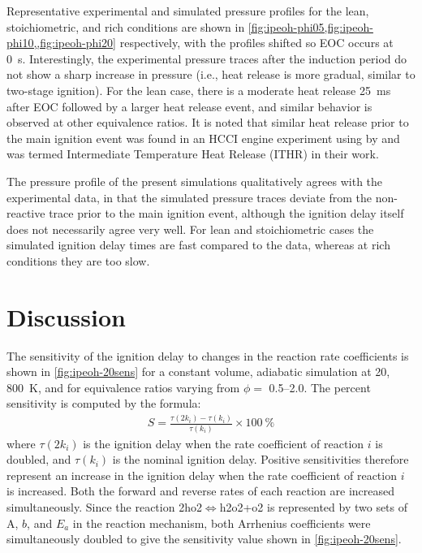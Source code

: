 \documentclass[../main.tex]{subfiles}
\begin{document}
Representative experimental and simulated pressure profiles for the lean,
stoichiometric, and rich conditions are shown in
\cref{fig:ipeoh-phi05,fig:ipeoh-phi10,,fig:ipeoh-phi20} respectively,
with the profiles shifted so EOC occurs at \SI{0}{\second}. Interestingly,
the experimental pressure traces after the induction period do not show
a sharp increase in pressure (i.e., heat release is more gradual,
similar to two-stage ignition). For the lean case, there is a moderate
heat release \SI{25}{\milli\second} after EOC followed by a larger heat
release event, and similar behavior is observed at other equivalence ratios.
It is noted that similar heat release prior to the main ignition event
was found in an HCCI engine experiment using \iPeOH{} by \textcite{Yang2010}
and was termed Intermediate Temperature Heat Release (ITHR) in their
work.

The pressure profile of the present simulations qualitatively
agrees with the experimental data, in that the simulated pressure
traces deviate from the non-reactive trace prior to the main ignition
event, although the ignition delay itself does not necessarily
agree very well. For lean and stoichiometric cases the simulated
ignition delay times are fast compared to the data, whereas at rich
conditions they are too slow.

\section{Discussion}
\label{sec:ipeoh-discussion}

The sensitivity of the ignition delay to changes in the reaction rate
coefficients is shown in \cref{fig:ipeoh-20sens} for a constant volume,
adiabatic simulation at \SI{20}{\atmosphere}, \SI{800}{\kelvin}, and for
equivalence ratios varying from $\phi=$ \numrange{0.5}{2.0}. The percent
sensitivity is computed by the formula:
%
\begin{align}
S = \frac{\tau(2k_i)-\tau(k_i)}{\tau(k_i)} \times \SI{100}{\percent}
\end{align}
%
where $\tau(2k_i)$ is the ignition delay when the rate coefficient of
reaction $i$ is doubled, and $\tau(k_i)$ is the nominal ignition delay.
Positive sensitivities therefore represent an increase in the ignition
delay when the rate coefficient of reaction $i$ is increased. Both the
forward and reverse rates of each reaction are increased simultaneously.
Since the reaction 2ho2$\Leftrightarrow$h2o2+o2 is represented by two sets of $\mathrm{A}$, $b$,
and $E_a$ in the reaction mechanism, both Arrhenius coefficients were
simultaneously doubled to give the sensitivity value shown in \cref{fig:ipeoh-20sens}.
\end{document}
